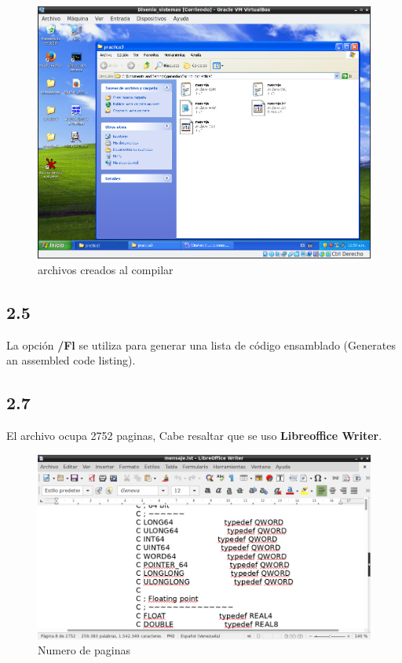 \begin{figure}[H]
  \includegraphics[width=\linewidth]{practica3/imagenes/actividad2/archivos_compilacion.png}
  \caption{archivos creados al compilar}
\end{figure}

\subsection*{2.5}
La opción \textbf{/Fl} se utiliza para generar una lista de código ensamblado (Generates an assembled code listing).

\subsection*{2.7}
El archivo ocupa 2752 paginas, Cabe resaltar que se uso \textbf{Libreoffice  Writer}.

\begin{figure}[H]
  \includegraphics[width=\linewidth]{practica3/imagenes/actividad2/mensaje_lst_word.png}
  \caption{Numero de paginas}
\end{figure}

